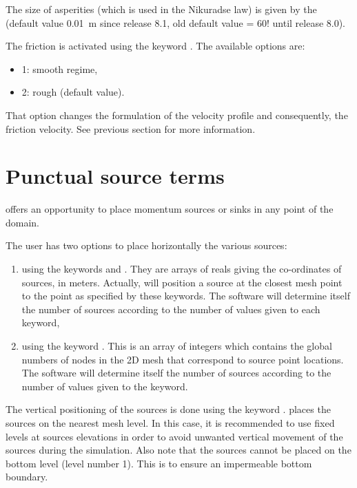 The size of asperities (which is used in the Nikuradse law) is given by the
 (default value
0.01~m since release 8.1, old default value = 60! until release 8.0).

The friction is activated using the keyword
.
The available options are:

\begin{itemize}
\item 1: smooth regime,

\item 2: rough (default value).
\end{itemize}

That option changes the formulation of the velocity profile and consequently,
the friction velocity. See previous section for more information.

\section{Punctual source terms}
\label{sec:srcfile}
 offers an opportunity to place momentum sources or sinks in any
point of the domain.

The user has two options to place horizontally the various sources:
\begin{enumerate}
\item  using the keywords  and
. They are arrays of reals giving the co-ordinates
of sources, in meters. Actually,  will position a source at the
closest mesh point to the point as specified by these keywords. The software
will determine itself the number of sources according to the number of values
given to each keyword,
\item using the keyword .
This is an array of integers which contains the global numbers of nodes
in the 2D mesh that correspond to source point locations. The software
will determine itself the number of sources according to the number of values
given to the keyword.
\end{enumerate}

The vertical positioning of the sources is done using the keyword
.  places the sources on the nearest
mesh level. In this case, it is recommended to use fixed levels at sources
elevations in order to avoid unwanted vertical movement of the sources during
the simulation. Also note that the sources cannot be placed on the bottom level
(level number 1). This is to ensure an impermeable bottom boundary.

